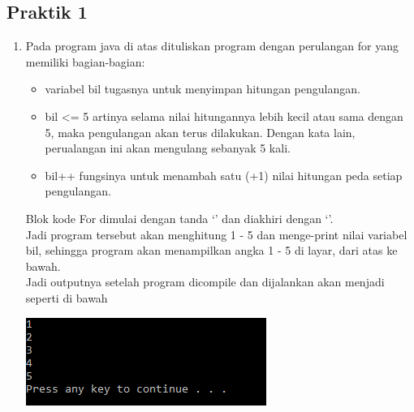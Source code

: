 \documentclass[a4paper,12pt]{article}
\begin{document}
\subsection{Praktik 1}
\begin{enumerate}[label=\alph*.]
	\item 
	\begin{minipage}[t]{\linewidth}
		\raggedright
	\end{minipage}
	Pada program java di atas dituliskan program dengan perulangan for yang memiliki bagian-bagian:
	\begin{itemize}
		\item     variabel bil tugasnya untuk menyimpan hitungan pengulangan.
		\item bil <= 5 artinya selama nilai hitungannya lebih kecil atau sama dengan 5, maka pengulangan akan terus dilakukan. Dengan kata lain, perualangan ini akan mengulang sebanyak 5 kali.
		\item bil++ fungsinya untuk menambah satu (+1) nilai hitungan peda setiap pengulangan.
	
	\end{itemize}
	Blok kode For dimulai dengan tanda ‘{’ dan diakhiri dengan ‘}’.\\
	Jadi program tersebut akan menghitung 1 - 5 dan menge-print nilai variabel bil, sehingga program akan menampilkan angka 1 - 5 di layar, dari atas ke bawah.\\
	Jadi outputnya setelah program dicompile dan dijalankan akan menjadi seperti di bawah
	\begin{center}
		\includegraphics[scale=1]{Capture2}
	\end{center}
	

\end{enumerate}
\end{document}
